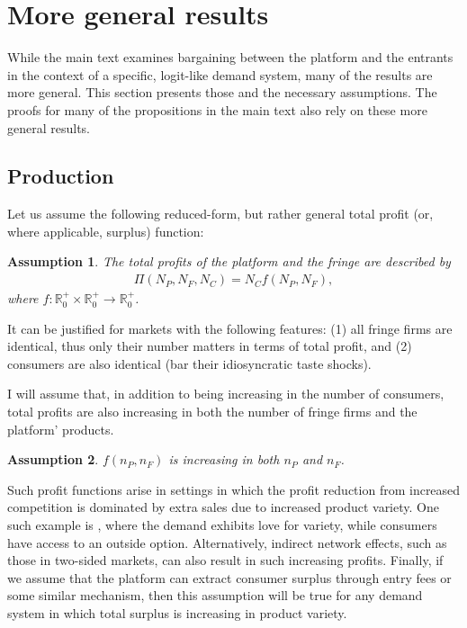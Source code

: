 \documentclass[a4paper]{article}
\newtheorem{assumption}{Assumption}
\begin{document}
\section{More general results}
\label{sec:results_more_general}

While the main text examines bargaining between the platform and the entrants in the context of a specific, logit-like demand system, many of the results are more general.
This section presents those and the necessary assumptions.
The proofs for many of the propositions in the main text also rely on these more general results.

\subsection{Production}
\label{sec:more_general_production}

Let us assume the following reduced-form, but rather general total profit (or, where applicable, surplus) function:
\begin{assumption}
    \label{ass:identical_fringe}
    The total profits of the platform and the fringe are described by 
    \begin{align*}
        \Pi(N_P, N_F, N_C) = N_C f(N_P, N_F),
    \end{align*}
    where $f: \mathbb{R}^+_0 \times \mathbb{R}^+_0 \to \mathbb{R}^+_0$.
\end{assumption}
It can be justified for markets with the following features: (1) all fringe firms are identical, thus only their number matters in terms of total profit, and (2) consumers are also identical (bar their idiosyncratic taste shocks).

I will assume that, in addition to being increasing in the number of consumers, total profits are also increasing in both the number of fringe firms and the platform' products.
\begin{assumption}
    \label{ass:monotone_profits}
    $f(n_P, n_F)$ is increasing in both $n_P$ and $n_F$.
\end{assumption}
Such profit functions arise in settings in which the profit reduction from increased competition is dominated by extra sales due to increased product variety.
One such example is \textcite{anderson2020aggregative}, where the demand exhibits love for variety, while consumers have access to an outside option.
Alternatively, indirect network effects, such as those in two-sided markets, can also result in such increasing profits.
Finally, if we assume that the platform can extract consumer surplus through entry fees or some similar mechanism, then this assumption will be true for any demand system in which total surplus is increasing in product variety.
\end{document}
